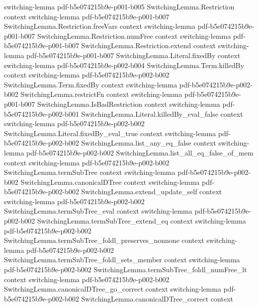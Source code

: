 \begin{lemma}
  {switching-lemma}
  {pdf-b5e074215b9e-p001-b005}
\proofstep
  {SwitchingLemma.Restriction}
  {context}
  {switching-lemma}
  {pdf-b5e074215b9e-p001-b007}
\proofstep
  {SwitchingLemma.Restriction.freeVars}
  {context}
  {switching-lemma}
  {pdf-b5e074215b9e-p001-b007}
\proofstep
  {SwitchingLemma.Restriction.numFree}
  {context}
  {switching-lemma}
  {pdf-b5e074215b9e-p001-b007}
\proofstep
  {SwitchingLemma.Restriction.extend}
  {context}
  {switching-lemma}
  {pdf-b5e074215b9e-p001-b007}
\proofstep
  {SwitchingLemma.Literal.fixedBy}
  {context}
  {switching-lemma}
  {pdf-b5e074215b9e-p002-b004}
\proofstep
  {SwitchingLemma.Term.killedBy}
  {context}
  {switching-lemma}
  {pdf-b5e074215b9e-p002-b002}
\proofstep
  {SwitchingLemma.Term.fixedBy}
  {context}
  {switching-lemma}
  {pdf-b5e074215b9e-p002-b002}
\proofstep
  {SwitchingLemma.restrictFn}
  {context}
  {switching-lemma}
  {pdf-b5e074215b9e-p001-b007}
\proofstep
  {SwitchingLemma.IsBadRestriction}
  {context}
  {switching-lemma}
  {pdf-b5e074215b9e-p002-b001}
\proofstep
  {SwitchingLemma.Literal.killedBy_eval_false}
  {context}
  {switching-lemma}
  {pdf-b5e074215b9e-p002-b002}
\proofstep
  {SwitchingLemma.Literal.fixedBy_eval_true}
  {context}
  {switching-lemma}
  {pdf-b5e074215b9e-p002-b002}
\proofstep
  {SwitchingLemma.list_any_eq_false}
  {context}
  {switching-lemma}
  {pdf-b5e074215b9e-p002-b002}
\proofstep
  {SwitchingLemma.list_all_eq_false_of_mem}
  {context}
  {switching-lemma}
  {pdf-b5e074215b9e-p002-b002}
\proofstep
  {SwitchingLemma.termSubTree}
  {context}
  {switching-lemma}
  {pdf-b5e074215b9e-p002-b002}
\proofstep
  {SwitchingLemma.canonicalDTree}
  {context}
  {switching-lemma}
  {pdf-b5e074215b9e-p002-b002}
\proofstep
  {SwitchingLemma.extend_update_self}
  {context}
  {switching-lemma}
  {pdf-b5e074215b9e-p002-b002}
\proofstep
  {SwitchingLemma.termSubTree_eval}
  {context}
  {switching-lemma}
  {pdf-b5e074215b9e-p002-b002}
\proofstep
  {SwitchingLemma.termSubTree_extend_eq}
  {context}
  {switching-lemma}
  {pdf-b5e074215b9e-p002-b002}
\proofstep
  {SwitchingLemma.termSubTree_foldl_preserves_nonnone}
  {context}
  {switching-lemma}
  {pdf-b5e074215b9e-p002-b002}
\proofstep
  {SwitchingLemma.termSubTree_foldl_sets_member}
  {context}
  {switching-lemma}
  {pdf-b5e074215b9e-p002-b002}
\proofstep
  {SwitchingLemma.termSubTree_foldl_numFree_lt}
  {context}
  {switching-lemma}
  {pdf-b5e074215b9e-p002-b002}
\proofstep
  {SwitchingLemma.canonicalDTree_go_correct}
  {context}
  {switching-lemma}
  {pdf-b5e074215b9e-p002-b002}
\proofstep
  {SwitchingLemma.canonicalDTree_correct}
  {context}

\end{lemma}
